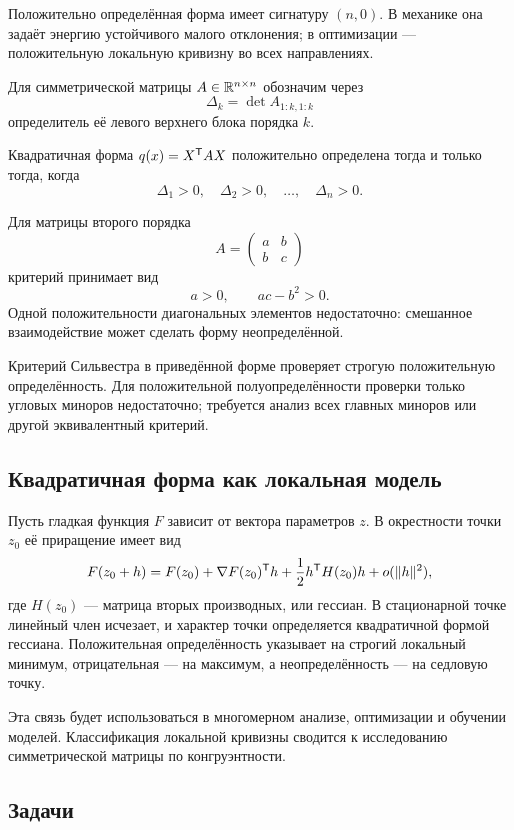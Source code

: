 Положительно определённая форма имеет сигнатуру $(n,0)$. В механике она задаёт энергию устойчивого малого отклонения; в оптимизации --- положительную локальную кривизну во всех направлениях.

Для симметрической матрицы $A\in\mathbb{R}^{n\times n}$ обозначим через
\[
\Delta_k
=
\det A_{1:k,1:k}
\]
определитель её левого верхнего блока порядка $k$.

\begin{criterion}
Квадратичная форма $q(x)=X^{\mathsf{T}}AX$ положительно определена тогда и только тогда, когда
\[
\Delta_1>0,\quad \Delta_2>0,\quad\dots,\quad\Delta_n>0.
\]
\end{criterion}

Для матрицы второго порядка
\[
A=
\begin{pmatrix}
a&b\\b&c\end{pmatrix}
\]
критерий принимает вид
\[
a>0,
\qquad
ac-b^2>0.
\]
Одной положительности диагональных элементов недостаточно: смешанное взаимодействие может сделать форму неопределённой.

\begin{remark}
Критерий Сильвестра в приведённой форме проверяет строгую положительную определённость. Для положительной полуопределённости проверки только угловых миноров недостаточно; требуется анализ всех главных миноров или другой эквивалентный критерий.
\end{remark}

\subsection{Квадратичная форма как локальная модель}

Пусть гладкая функция $F$ зависит от вектора параметров $z$. В окрестности точки $z_0$ её приращение имеет вид
\[
F(z_0+h)
=
F(z_0)
+\nabla F(z_0)^{\mathsf{T}}h
+\frac12 h^{\mathsf{T}}H(z_0)h
+o(\lVert h\rVert^2),
\]
где $H(z_0)$ --- матрица вторых производных, или гессиан. В стационарной точке линейный член исчезает, и характер точки определяется квадратичной формой гессиана. Положительная определённость указывает на строгий локальный минимум, отрицательная --- на максимум, а неопределённость --- на седловую точку.

Эта связь будет использоваться в многомерном анализе, оптимизации и обучении моделей. Классификация локальной кривизны сводится к исследованию симметрической матрицы по конгруэнтности.

\subsection*{Задачи}

